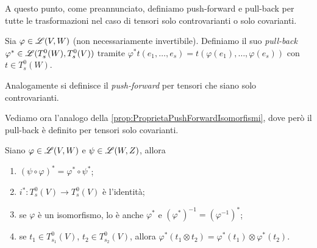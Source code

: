 A questo punto, come preannunciato, definiamo push-forward e pull-back per tutte le trasformazioni nel caso di tensori solo controvarianti o solo covarianti.

\begin{definition}  
	Sia $\varphi\in \mathscr L(V,W)$ (non necessariamente invertibile). Definiamo il suo \emph{pull-back} $\varphi^*\in \mathscr L(T_s^0(W),T_s^0(V))$ tramite $\varphi^*t(e_1,\ldots,e_s) = t(\varphi(e_1),\ldots,\varphi(e_s))$ con $t\in T_s^0(W)$.
	
	Analogamente si definisce il \emph{push-forward} per tensori che siano solo controvarianti.
\end{definition}

Vediamo ora l'analogo della \cref{prop:ProprietaPushForwardIsomorfismi}, dove però il pull-back è definito per tensori solo covarianti. %

\begin{proposition}
	Siano $\varphi\in \mathscr L(V,W)$ e $\psi\in \mathscr L(W,Z)$, allora
	\begin{enumerate}
		\item $(\psi\circ\varphi)^*=\varphi^*\circ\psi^*$;
		\item $i^*:T_s^0(V) \to T_s^0(V)$ è l'identità;
		\item se $\varphi$ è un isomorfismo, lo è anche $\varphi^*$ e $(\varphi^*)^{-1} = (\varphi^{-1})^*$;
		\item se $t_1\in T_{s_1}^0(V)$, $t_2\in T_{s_2}^0(V)$, allora $\varphi^*(t_1\otimes t_2) = \varphi^*(t_1)\otimes \varphi^*(t_2)$.
	\end{enumerate}
\end{proposition}


